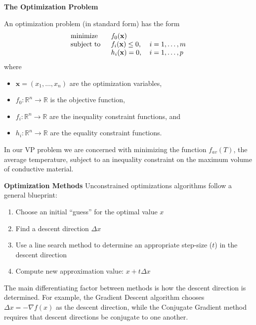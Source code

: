 \documentclass[final]{beamer}
\begin{document}
\begin{frame}{\textbf{The Optimization Problem}}
	\pause
	\begin{definition}
		An optimization problem (in standard form) has the form
		\begin{equation}
			\begin{tabular}{lll}
				\text{minimize }   & $f_0(\mathbf{x})$        &                 \\
				\text{subject to } & $f_i(\mathbf{x})\leq 0$, & $i=1,\ldots, m$ \\
				& $h_i(\mathbf{x}) = 0$,   & $i=1,\ldots, p$ 
			\end{tabular}\label{Optimization}
		\end{equation}
		where
		\begin{itemize}
			\item $\mathbf{x}=\left(x_1,\ldots,x_n\right)$ are the optimization variables,
			\item $f_0 : \mathbb{R}^n\rightarrow\mathbb{R}$ is the objective function,
			\item $f_i : \mathbb{R}^n\rightarrow\mathbb{R}$ are the inequality constraint functions, and
			\item $h_i : \mathbb{R}^n\rightarrow\mathbb{R}$ are the equality constraint functions.
		\end{itemize}
	\end{definition}
	\pause
	In our VP problem we are concerned with minimizing the function {\color{baystate}$f_{av}(T)$, the average temperature,} subject to an inequality constraint on the maximum volume of conductive material.
\end{frame}

\begin{frame}{\textbf{Optimization Methods}}
	Unconstrained optimizations algorithms follow a general blueprint:\pause
	\begin{enumerate}
		\item Choose an initial ``guess'' for the optimal value $x$\pause
		\item Find a {\color{baystate}descent direction} $\Delta x$\pause
		\item Use a {\color{baystate}line search} method to determine an appropriate step-size ($t$) in the descent direction\pause
		\item Compute new approximation value: $x+t\Delta x$\pause
	\end{enumerate}
	\pause
	\vfill
	The main differentiating factor between methods is {\color{tiananmen}how the descent direction is determined}.\pause
	\vfill
	For example, the Gradient Descent algorithm chooses $\Delta x=-\nabla f(x)$ as the descent direction, while the Conjugate Gradient method requires that descent directions be conjugate to one another.
\end{frame}
\end{document}
